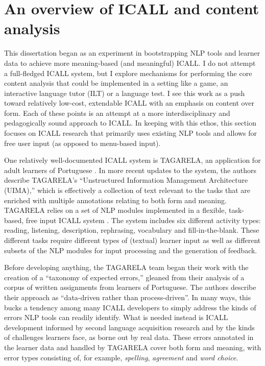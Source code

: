 \section{An overview of ICALL and content analysis}
\label{section:ICALLoverview}
This dissertation began as an experiment in bootstrapping NLP tools and learner data to achieve more meaning-based (and meaningful) ICALL. I do not attempt a full-fledged ICALL system, but I explore mechanisms for performing the core content analysis that could be implemented in a setting like a game, an interactive language tutor (ILT) or a language test. I see this work as a push toward relatively low-cost, extendable ICALL with an emphasis on content over form. Each of these points is an attempt at a more interdisciplinary and pedagogically sound approach to ICALL. In keeping with this ethos, this section focuses on ICALL research that primarily uses existing NLP tools and allows for free user input (as opposed to menu-based input).

One relatively well-documented ICALL system is TAGARELA, an application for adult learners of Portuguese \cite{amaral2007designing,amaral:meurers:user:07}. In more recent updates to the system, the authors describe TAGARELA's ``Unstructured Information Management Architecture (UIMA),'' which is effectively a collection of text relevant to the tasks that are enriched with multiple annotations relating to both form and meaning. TAGARELA relies on a set of NLP modules implemented in a flexible, task-based, free input ICALL system \cite{Amaral.Meurers.Ziai-11}. The system includes six different activity types: reading, listening, description, rephrasing, vocabulary and fill-in-the-blank. These different tasks require different types of (textual) learner input as well as different subsets of the NLP modules for input processing and the generation of feedback.

Before developing anything, the TAGARELA team began their work with the creation of a ``taxonomy of expected errors,'' gleaned from their analysis of a corpus of written assignments from learners of Portuguese. The authors describe their approach as ``data-driven rather than process-driven''. In many ways, this bucks a tendency among many ICALL developers to simply address the kinds of errors NLP tools can readily identify. What is needed instead is ICALL development informed by second language acquisition research and by the kinds of challenges learners face, as borne out by real data. These errors annotated in the learner data and handled by TAGARELA cover both form and meaning, with error types consisting of, for example, \textit{spelling}, \textit{agreement} and \textit{word choice}.

